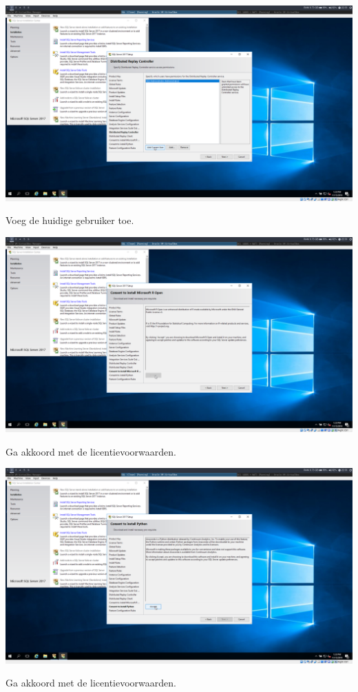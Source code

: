 \documentclass[a4paper]{article}
\begin{document}
\begin{center}
	\includegraphics[width=15cm]{Pictures/SQL/1542317599.png}
	
	Voeg de huidige gebruiker toe.
\end{center}
\begin{center}
	\includegraphics[width=15cm]{Pictures/SQL/1542317621.png}
	
	Ga akkoord met de licentievoorwaarden.
\end{center}
\begin{center}
	\includegraphics[width=15cm]{Pictures/SQL/1542317631.png}
	
	Ga akkoord met de licentievoorwaarden.
\end{center}
\end{document}
